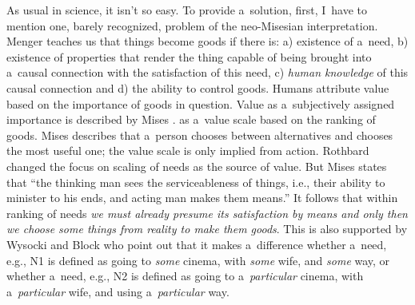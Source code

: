 As usual in science, it isn't so easy. To provide a~solution, first, I~have to mention one, barely recognized, problem of the neo-Misesian interpretation. Menger 
\parencite*[][p.52]{} %
 teaches us that things become goods if there is: a) existence of a~need, b) existence of properties that render the thing capable of being brought into a~causal connection with the satisfaction of this need, c) \textit{human knowledge} of this causal connection and d) the ability to control goods. Humans attribute value based on the importance of goods in question. Value as a~subjectively assigned importance is described by Mises .
\parencite[][p.160]{} %
 as a~value scale based on the ranking of goods. Mises 
\parencite[][pp.94–95]{} %
 describes that a~person chooses between alternatives and chooses the most useful one; the value scale is only implied from action. Rothbard changed the focus on scaling of needs as the source of value. But Mises 
\parencite[][p.92]{} %
 states that ``the thinking man sees the serviceableness of things, i.e., their ability to minister to his ends, and acting man makes them means.'' It follows that within ranking of needs \textit{we must already presume its satisfaction by means and only then we choose some things from reality to make them goods}. This is also supported by Wysocki and Block 
\parencite*[][]{} %
 who point out that it makes a~difference whether a~need, e.g., N1 is defined as going to \textit{some} cinema, with \textit{some} wife, and \textit{some} way, or whether a~need, e.g., N2 is defined as going to a~\textit{particular} cinema, with a~\textit{particular} wife, and using a~\textit{particular} way.




